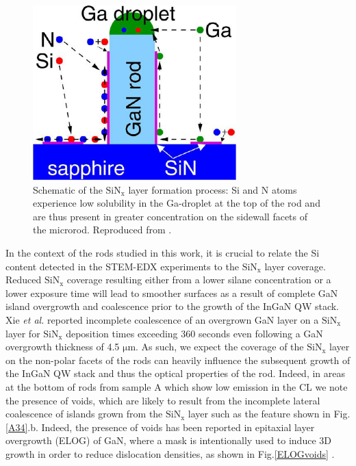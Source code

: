 \begin{figure}[!h]
	\centering
	\includegraphics[width=0.7\textwidth]{Figs/Ch6/TessarekSi.jpg}
	\caption{Schematic of the $\mathrm{SiN_{x}}$ layer formation process: Si and N atoms experience low solubility in the Ga-droplet at the top of the rod and are thus present in greater concentration on the sidewall facets of the microrod. Reproduced from \cite{Tessarek2014a}.}
	\label{TessSi}
\end{figure}
\FloatBarrier     
In the context of the rods studied in this work, it is crucial to relate the Si content detected in the STEM-EDX experiments to the  $\mathrm{SiN_{x}}$ layer coverage. Reduced $\mathrm{SiN_{x}}$ coverage resulting either from a lower silane concentration or a lower exposure time \cite{Xie2007,Halidou2004} will lead to smoother surfaces as a result of complete GaN island overgrowth and coalescence prior to the growth of the InGaN QW stack. Xie \textit{et al.} reported incomplete coalescence of an overgrown GaN layer on a $\mathrm{SiN_{x}}$ layer for $\mathrm{SiN_{x}}$ deposition times exceeding 360 seconds \cite{Xie2007} even following a GaN overgrowth thickness of 4.5 $\mathrm{\mu m}$. As such, we expect the coverage of the $\mathrm{SiN_{x}}$ layer on the non-polar facets of the rods can heavily influence the subsequent growth of the InGaN QW stack and thus the optical properties of the rod. Indeed, in areas at the bottom of rods from sample A which show low emission in the CL we note the presence of voids, which are likely to result from the incomplete lateral coalescence of islands grown from the $\mathrm{SiN_{x}}$ layer such as the feature shown in Fig.\ref{A34}.b. Indeed, the presence of voids has been reported in epitaxial layer overgrowth (ELOG) of GaN, where a mask is intentionally used to induce 3D growth in order to reduce dislocation densities, as shown in Fig.\ref{ELOGvoids} \cite{Bennett2010,Ji2016}.


